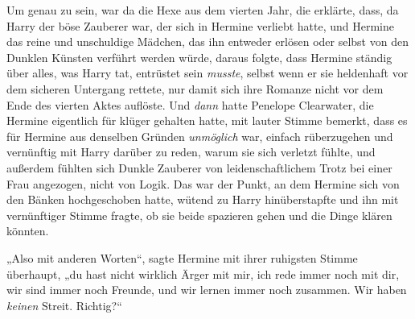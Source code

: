 Um genau zu sein, war da die Hexe aus dem vierten Jahr, die erklärte, dass, da Harry der böse Zauberer war, der sich in Hermine verliebt hatte, und Hermine das reine und unschuldige Mädchen, das ihn entweder erlösen oder selbst von den Dunklen Künsten verführt werden würde, daraus folgte, dass Hermine ständig über alles, was Harry tat, entrüstet sein \emph{musste}, selbst wenn er sie heldenhaft vor dem sicheren Untergang rettete, nur damit sich ihre Romanze nicht vor dem Ende des vierten Aktes auflöste. Und \emph{dann} hatte Penelope Clearwater, die Hermine eigentlich für klüger gehalten hatte, mit lauter Stimme bemerkt, dass es für Hermine aus denselben Gründen \emph{unmöglich} war, einfach rüberzugehen und vernünftig mit Harry darüber zu reden, warum sie sich verletzt fühlte, und außerdem fühlten sich Dunkle Zauberer von leidenschaftlichem Trotz bei einer Frau angezogen, nicht von Logik. Das war der Punkt, an dem Hermine sich von den Bänken hochgeschoben hatte, wütend zu Harry hinüberstapfte und ihn mit vernünftiger Stimme fragte, ob sie beide spazieren gehen und die Dinge klären könnten.

„Also mit anderen Worten“, sagte Hermine mit ihrer ruhigsten Stimme überhaupt, „du hast nicht wirklich Ärger mit mir, ich rede immer noch mit dir, wir sind immer noch Freunde, und wir lernen immer noch zusammen. Wir haben \emph{keinen} Streit. Richtig?“

